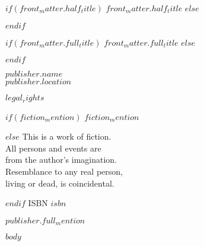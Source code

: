 \documentclass[$for(class_options)$$class_options$$sep$,$endfor$]{novel} %
\begin{document}
\frontmatter

\thispagestyle{empty}
$if(front_matter.half_title)$
$front_matter.half_title$
$else$
\vspace*{6\nbs}
\hfill\charscale[2.4]{\textbf{\theTitle}}\par
$endif$
\clearpage

\thispagestyle{empty}
\null
\clearpage

\thispagestyle{empty}
\vspace*{5\nbs}
\begin{center}
$if(front_matter.full_title)$
$front_matter.full_title$
$else$
\charscale[3.6]{\textbf{\theTitle}}\par
$endif$
\vspace{1.5\nbs}
\charscale[1.6]{\theSubtitle}\par
\vspace{4\nbs}
\vspace{4\nbs}
{\theAuthor}
\vfill
{ $publisher.name$\\
$publisher.location$}\par

\end{center}
\clearpage


\thispagestyle{empty}
\begin{center}
\itshape{
\null
\vfill
\textsc{\theTitle}\par
\par

$legal_rights$\par
\vspace{1\nbs}
$if(fiction_mention)$
$fiction_mention$\par
$else$
This is a work of fiction.\\
All persons and events are\\
from the author's imagination.\\
Resemblance to any real person,\\
living or dead, is coincidental.\par
$endif$
\vspace{1\nbs}
ISBN $isbn$\par %
\vspace{1\nbs}

$publisher.full_mention$
} %
\end{center}
\clearpage

$body$
\end{document}
